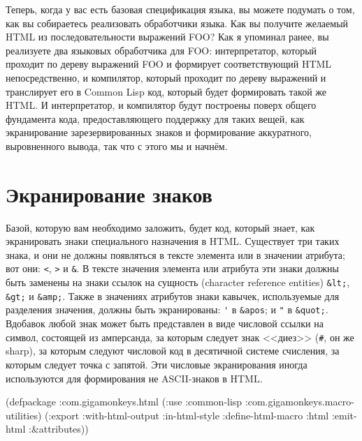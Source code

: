 Теперь, когда у вас есть базовая спецификация языка, вы можете подумать о том, как вы
собираетесь реализовать обработчики языка. Как вы получите желаемый HTML из
последовательности выражений FOO? Как я упоминал ранее, вы реализуете два языковых
обработчика для FOO: интерпретатор, который проходит по дереву выражений FOO и формирует
соответствующий HTML непосредственно, и компилятор, который проходит по дереву выражений и
транслирует его в Common Lisp код, который будет формировать такой же HTML. И
интерпретатор, и компилятор будут построены поверх общего фундамента кода, предоставляющего
поддержку для таких вещей, как экранирование зарезервированных знаков и формирование
аккуратного, выровненного вывода, так что с этого мы и начнём.

\section{Экранирование знаков}

Базой, которую вам необходимо заложить, будет код, который знает, как экранировать знаки
специального назначения в HTML. Существует три таких знака, и они не должны появляться в
тексте элемента или в значении атрибута; вот они: \lstinline{<}, \lstinline{>} и
\lstinline!&!. В тексте значения элемента или атрибута эти знаки должны быть заменены на
знаки ссылок на сущность (character reference entities) \lstinline!&lt;!, \lstinline!&gt;!
и \lstinline!&amp;!. Также в значениях атрибутов знаки кавычек, используемые для
разделения значения, должны быть экранированы: \lstinline!'! в \lstinline!&apos!; и
\lstinline!"! в \lstinline!&quot;!. Вдобавок любой знак может быть представлен в виде
числовой ссылки на символ, состоящей из амперсанда, за которым следует знак <<диез>>
(\lstinline!#!, он же sharp), за которым следуют числовой код в десятичной системе
счисления, за которым следует точка с запятой. Эти числовые экранирования иногда
используются для формирования не ASCII-знаков в HTML.

\begin{lrbox}{\chthreezeroone}
  \begin{minipage}{\linewidth}
\begin{myverb}
(defpackage :com.gigamonkeys.html
  (:use :common-lisp :com.gigamonkeys.macro-utilities)
  (:export :with-html-output
           :in-html-style
           :define-html-macro
           :html
           :emit-html
           :\&attributes))
\end{myverb}
  \end{minipage}
\end{lrbox}


